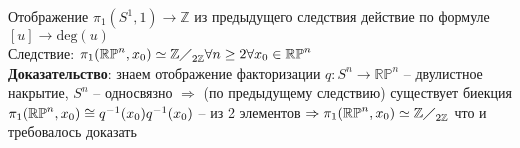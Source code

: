 	Отображение ${\pi}_1 (S^1, 1) \rightarrow \mathbb{Z}$ из предыдущего следствия действие по формуле $[u] \rightarrow \text{deg}(u)$\\
	Следствие: ${\pi}_1 (\mathbb{RP}^n, x_0) \simeq {\mathbb{Z}\diagup}_{2\mathbb{Z}} \forall n \geq 2 \forall x_0 \in \mathbb{RP}^n$\\
	\textbf{Доказательство}: знаем отображение факторизации $q: S^n \rightarrow \mathbb{RP}^n$ -- двулистное накрытие, $S^n$ -- односвязно $\Rightarrow$ (по предыдущему следствию) существует биекция ${\pi}_1 (\mathbb{RP}^n, x_0) \cong q^{-1} (x_0)\\
	q^{-1} (x_0)$ -- из 2 элементов $\Rightarrow {\pi}_1 (\mathbb{RP}^n, x_0) \simeq {\mathbb{Z}\diagup}_{2\mathbb{Z}}$ что и требовалось доказать\\


\newpage
